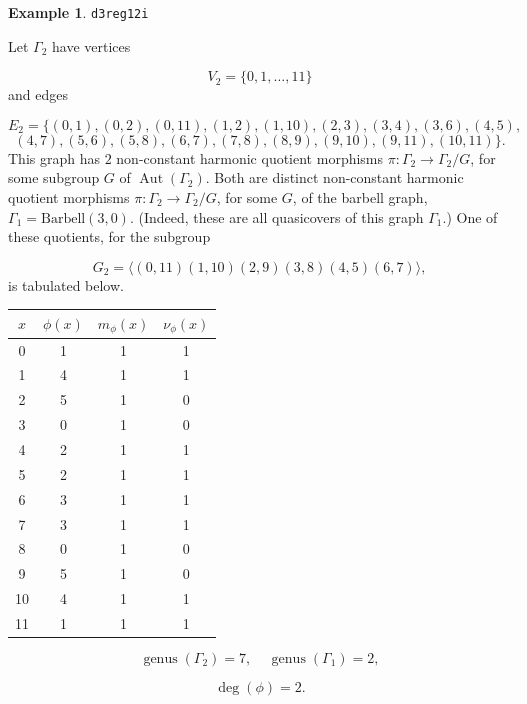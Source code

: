 \documentclass[12pt,letterpaper]{article}
\theoremstyle{definition}
\newtheorem{example}[theorem]{Example}
\DeclareMathOperator{\Aut}{Aut}
\DeclareMathOperator{\genus}{genus}
\begin{document}
\begin{example}%
\label{example:d3reg12i}
  {\tt d3reg12i}\newline
{\rm  
Let $\Gamma_2$ have vertices

\[
V_2=\{0,1,\dots,11\}
\]
and edges

\[
E_2 = \{
(0, 1), (0, 2), (0, 11), (1, 2), (1, 10), (2, 3), (3, 4), (3, 6), (4, 5),
\]
\[
(4, 7), (5, 6), (5, 8), (6, 7), (7, 8), (8, 9), (9, 10), (9, 11), (10, 11)
\}.
\]
This graph has $2$ non-constant harmonic quotient
morphisms $\pi: \Gamma_2\to \Gamma_2/G$, for some subgroup
$G$ of $\Aut(\Gamma_2)$. Both are distinct non-constant harmonic quotient
morphisms $\pi: \Gamma_2\to \Gamma_2/G$, for some $G$, of the barbell
graph, $\Gamma_1=\mathrm{Barbell}(3,0)$.
(Indeed, these are all quasicovers of this graph $\Gamma_1$.)
One of these quotients, for the subgroup

\[
G_2=\langle (0,11)(1,10)(2,9)(3,8)(4,5)(6,7) \rangle,
\]
is tabulated below.
\begin{center}
\begin{tabular}{c|c|c|c}  
  $x$ & $\phi(x)$ & $m_\phi(x)$ & $\nu_\phi(x)$ \\ \hline
  0   &    1   &        1         &  1   \\ 
  1   &    4   &        1         &  1   \\ 
  2   &    5   &        1         &  0   \\ 
  3   &    0   &        1         &  0   \\ 
  4   &    2   &        1         &  1   \\ 
  5   &    2   &        1         &  1    \\ 
  6   &    3   &        1         &  1   \\ 
  7   &    3   &        1         &  1   \\
  8   &    0   &        1         &  0   \\
  9   &    5   &        1         &  0   \\
  10  &    4   &        1         &  1   \\
  11  &    1   &        1         &  1   \\ 
\end{tabular}
\end{center}

\[
  \genus(\Gamma_2) =7,\ \ \ \ \
  \genus(\Gamma_1) =2,
\]

\[
\deg(\phi) =2.
\]

}
\end{example}
\end{document}
